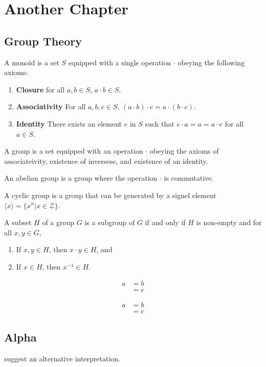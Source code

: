 \chapter{Another Chapter}
\label{cha:another-chapter}

\section{Group Theory}
\label{sec:group-theory}

\begin{defn}
  A monoid is a set $S$ equipped with a single operation $\cdot$
  obeying the following axioms:
  \begin{enumerate}
  \item \textbf{Closure} for all $a, b \in S$, $a \cdot b \in S$.
  \item \textbf{Associativity} For all $a,b,c \in S$, $(a \cdot b)
    \cdot c = a \cdot (b \cdot c)$.
  \item \textbf{Identity} There exists an element $e$ in $S$ such that
    $e \cdot a = a = a \cdot e$ for all $a \in S$.
  \end{enumerate}
\end{defn}

\begin{defn}
  A group is a set equipped with an operation $\cdot$ obeying the
  axioms of associateivity, existence of inversese, and existence of
  an identity.
\end{defn}

\begin{defn}
  An abelian group is a group where the operation $\cdot$ is
  commutative.
\end{defn}

\begin{defn}
  A cyclic group is a group that can be generated by a signel element
  $\langle x \rangle = \{ x^{n} | x \in \mathcal{Z} \}$.
\end{defn}

\begin{defn}
  A subset $H$ of a group $G$ is a subgroup of $G$ if and only if $H$
  is non-empty and for all $x, y \in G$,
  \begin{enumerate}
  \item If $x, y \in H$, then $x \cdot y \in H$, and
  \item If $x \in H$, then $x^{-1} \in H$.
  \end{enumerate}
\end{defn}

\begin{align*}
  a & = b \\
    & = c
\end{align*}

\begin{align*}
  a & = b \\
    & = c
\end{align*}

\section{Alpha}
\label{sec:alpha}

\citet{asdf} suggest an alternative interpretation.

